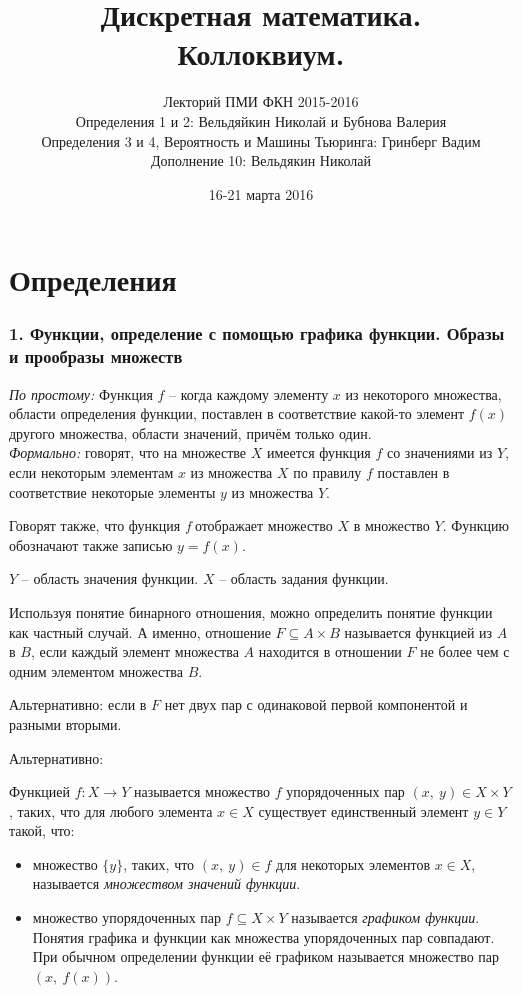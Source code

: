 \documentclass[a4paper, 12pt]{article}
\begin{document}
\title{Дискретная математика.\\ Коллоквиум.}
\author{Лекторий ПМИ ФКН 2015-2016\\ Определения 1 и 2: Вельдяйкин Николай и Бубнова Валерия \\ Определения 3 и 4, Вероятность и Машины Тьюринга: Гринберг Вадим \\ Дополнение 10: Вельдякин Николай}
\date{16-21 марта 2016}

\maketitle

\part*{Определения}

\section*{1. Функции, определение с помощью графика функции. Образы и прообразы множеств}
\textit{По простому:} Функция  $f$ -- когда каждому элементу $x$ из некоторого множества, области определения функции, поставлен в соответствие какой-то элемент $f(x)$ другого множества, области значений, причём только один. 
\\
\textit{Формально:} говорят, что на множестве $X$ имеется функция $f$ со значениями из $Y$, если некоторым элементам $x$ из множества $X$ по правилу $f$ поставлен в соответствие некоторые элементы $y$ из множества $Y$.

\par Говорят также, что функция $f\ \textit{отображает}$ множество $X$ в множество $Y$. Функцию обозначают также записью $y = f(x)$.

$Y$ -- область значения функции. $X$ -- область задания функции.

\par Используя понятие бинарного отношения, можно определить понятие функции как частный случай. А именно, отношение $F \subseteq A \times B$ называется функцией из $A$ в $B$, если каждый элемент множества $A$ находится в отношении $F$ не более чем с одним элементом множества $B$.
\par Альтернативно: если в $F$ нет двух пар с одинаковой первой компонентой и разными вторыми. 
\par Альтернативно:
\par Функцией $f:X \to Y$  называется множество $f$ упорядоченных пар $(x,\ y) \in X \times Y$, таких, что для любого элемента $x \in X$ существует единственный элемент $y \in Y$ такой, что:
\begin{itemize}
\item множество $\{y\}$, таких, что $(x,\ y) \in f$ для некоторых элементов $x \in X$, называется \textit{множеством значений функции}.
\item множество упорядоченных пар $f \subseteq X \times Y$ называется \textit{графиком функции}. Понятия графика и функции как множества упорядоченных пар совпадают. При обычном определении функции её графиком называется множество пар $(x,\ f(x))$.
\end{itemize}
\end{document}
